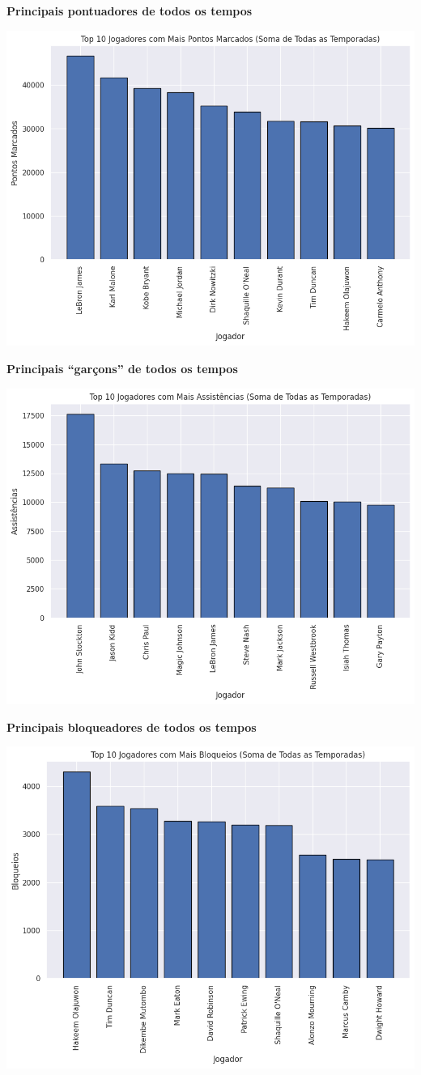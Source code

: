 \documentclass[
]{book}
\begin{document}
\textbf{Principais pontuadores de todos os tempos}

\includegraphics{imagens/16.png}

\textbf{Principais ``garçons'' de todos os tempos}

\includegraphics{imagens/17.png}

\textbf{Principais bloqueadores de todos os tempos}

\includegraphics{imagens/18.png}
\end{document}
